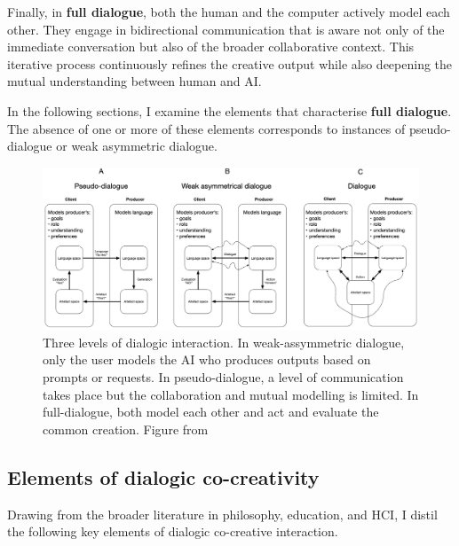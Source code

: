 Finally, in \textbf{full dialogue}, both the human and the computer actively model each other. They engage in bidirectional communication that is aware not only of the immediate conversation but also of the broader collaborative context. This iterative process continuously refines the creative output while also deepening the mutual understanding between human and AI. 

In the following sections, I examine the elements that characterise \textbf{full dialogue}. The absence of one or more of these elements corresponds to instances of pseudo-dialogue or weak asymmetric dialogue.

\begin{figure}
    \centering
    \includegraphics[width=1\linewidth]{levels of dialogue.png}
    \caption{Three levels of dialogic interaction. In weak-assymmetric dialogue, only the user models the AI who produces outputs based on prompts or requests. In pseudo-dialogue, a level of communication takes place but the collaboration and mutual modelling is limited. In full-dialogue, both model each other and act and evaluate the common creation.  Figure from \cite{Bown2024-yx}}
    \label{fig:enter-label}
\end{figure}
\subsection{Elements of dialogic co-creativity}

Drawing from the broader literature in philosophy, education, and HCI, I distil the following key elements of dialogic co-creative interaction. 

